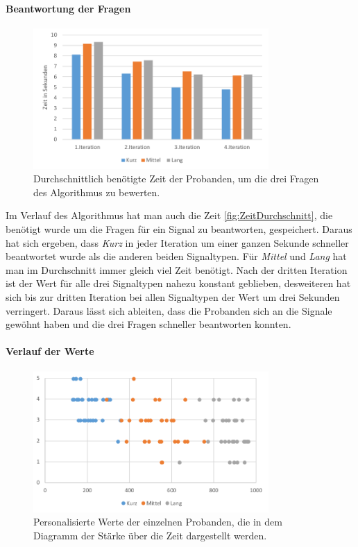 \paragraph{Beantwortung der Fragen}
\begin{figure}[htbp] 
            \centering
   	\includegraphics[width=0.8\textwidth]{pics/analyse/algo/ZeitDurchschnitt.png}
	\caption{Durchschnittlich ben{\"o}tigte Zeit der Probanden, um die drei Fragen des Algorithmus zu bewerten.}
	\label{fig:ZeitDurchschnitt}
\end{figure}
Im Verlauf des Algorithmus hat man auch die Zeit \autoref{fig:ZeitDurchschnitt}, die ben{\"o}tigt wurde um die Fragen f{\"u}r ein Signal zu beantworten, gespeichert. 
Daraus hat sich ergeben, dass \textit{Kurz} in jeder Iteration um einer ganzen Sekunde schneller beantwortet wurde als die anderen beiden Signaltypen. 
F{\"u}r \textit{Mittel} und \textit{Lang} hat man im Durchschnitt immer gleich viel Zeit ben{\"o}tigt.
Nach der dritten Iteration ist der Wert f{\"u}r alle drei Signaltypen nahezu konstant geblieben, desweiteren hat sich bis zur dritten Iteration bei allen Signaltypen der Wert um drei Sekunden verringert. 
Daraus l{\"a}sst sich ableiten, dass die Probanden sich an die Signale gew{\"o}hnt haben und die drei Fragen schneller beantworten konnten.

\paragraph{Verlauf der Werte}
\begin{figure}[htbp] 
            \centering
   	\includegraphics[width=0.8\textwidth]{pics/analyse/algo/ergebnisnachAlgo.png}
	\caption{Personalisierte Werte der einzelnen Probanden, die in dem Diagramm der St{\"a}rke {\"u}ber die Zeit dargestellt werden.}
	\label{fig:ergebnisNachAlgo}
\end{figure}

